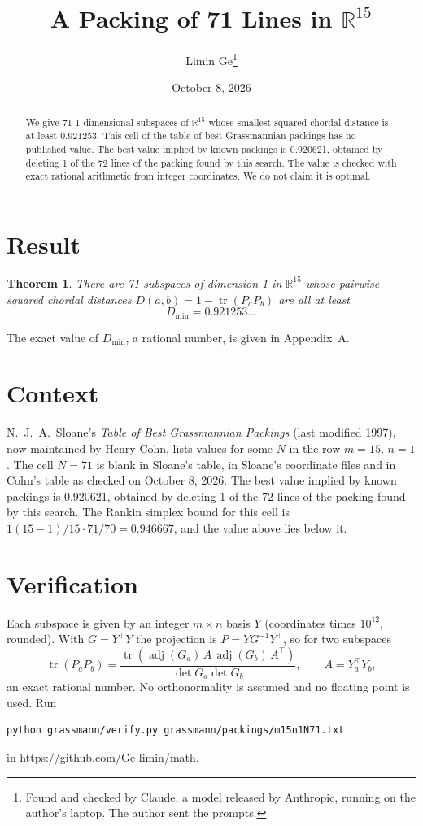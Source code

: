 \documentclass[11pt,a4paper]{article}
\title{A Packing of 71 Lines in $\mathbb{R}^{15}$}
\author{Limin Ge\thanks{Found and checked by Claude, a model released by Anthropic, running on the author's laptop. The author sent the prompts.}}
\date{October 8, 2026}
\newtheorem*{theorem}{Theorem}
\begin{document}
\maketitle
\begin{abstract}
We give 71 1-dimensional subspaces of $\mathbb{R}^{15}$ whose smallest squared chordal distance is at least 0.921253. This cell of the table of best Grassmannian packings has no published value. The best value implied by known packings is 0.920621, obtained by deleting 1 of the 72 lines of the packing found by this search. The value is checked with exact rational arithmetic from integer coordinates. We do not claim it is optimal.
\end{abstract}

\section{Result}
\begin{theorem}
There are 71 subspaces of dimension 1 in $\mathbb{R}^{15}$ whose pairwise squared chordal distances $D(a,b) = 1 - \operatorname{tr}(P_aP_b)$ are all at least
\[ D_{\min} = 0.921253\ldots \]
\end{theorem}
The exact value of $D_{\min}$, a rational number, is given in Appendix~A.


\section{Context}
N.~J.~A.~Sloane's \emph{Table of Best Grassmannian Packings} (last modified 1997), now maintained by Henry Cohn, lists values for some $N$ in the row $m=15$, $n=1$. The cell $N=71$ is blank in Sloane's table, in Sloane's coordinate files and in Cohn's table as checked on October 8, 2026. The best value implied by known packings is 0.920621, obtained by deleting 1 of the 72 lines of the packing found by this search. The Rankin simplex bound for this cell is $1(15-1)/15\cdot 71/70 = 0.946667$, and the value above lies below it.


\section{Verification}
Each subspace is given by an integer $m\times n$ basis $Y$ (coordinates times $10^{12}$, rounded). With $G=Y^\top Y$ the projection is $P=YG^{-1}Y^\top$, so for two subspaces
\[ \operatorname{tr}(P_aP_b)=\frac{\operatorname{tr}(\operatorname{adj}(G_a)\,A\,\operatorname{adj}(G_b)\,A^\top)}{\det G_a\det G_b},\qquad A=Y_a^\top Y_b, \]
an exact rational number. No orthonormality is assumed and no floating point is used. Run
\begin{verbatim}
python grassmann/verify.py grassmann/packings/m15n1N71.txt
\end{verbatim}
in \url{https://github.com/Ge-limin/math}.
\end{document}
